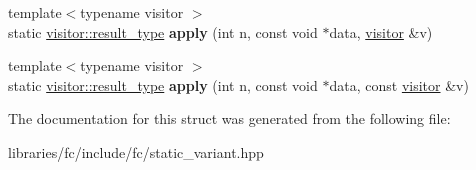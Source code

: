 \begin{DoxyCompactItemize}
{\footnotesize template$<$typename visitor $>$ }\\static \mbox{\hyperlink{struct_result}{visitor\+::result\+\_\+type}} {\bfseries apply} (int n, const void $\ast$data, \mbox{\hyperlink{structfc_1_1visitor}{visitor}} \&v)
\item 
\mbox{\label{structfc_1_1impl_1_1storage__ops_3_01_n_00_01_t_00_01_ts_8_8_8_01_4_a95e24166a633c2ba815f0d59f02b77ca}} 
{\footnotesize template$<$typename visitor $>$ }\\static \mbox{\hyperlink{struct_result}{visitor\+::result\+\_\+type}} {\bfseries apply} (int n, const void $\ast$data, const \mbox{\hyperlink{structfc_1_1visitor}{visitor}} \&v)
\end{DoxyCompactItemize}


The documentation for this struct was generated from the following file\+:\begin{DoxyCompactItemize}
\item 
libraries/fc/include/fc/static\+\_\+variant.\+hpp\end{DoxyCompactItemize}

